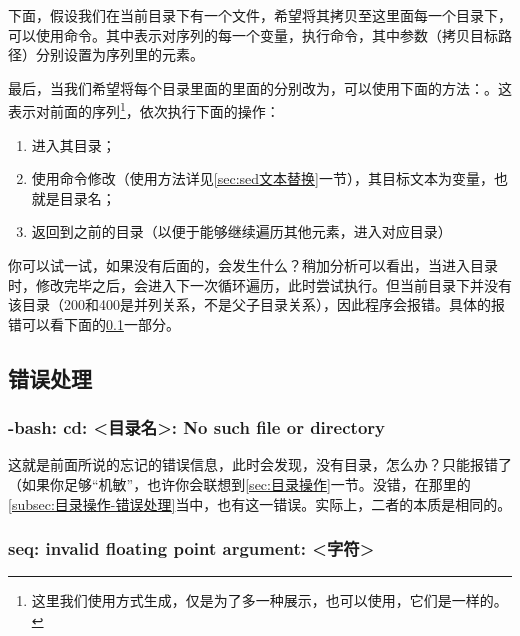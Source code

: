 下面，假设我们在当前目录下有一个文件，希望将其拷贝至这里面每一个目录下，可以使用命令。其中表示对序列的每一个变量，执行命令，其中参数（拷贝目标路径）分别设置为序列里的元素。

最后，当我们希望将每个目录里面的里面的分别改为，可以使用下面的方法：。这表示对前面的序列\footnote{这里我们使用方式生成，仅是为了多一种展示，也可以使用，它们是一样的。}，依次执行下面的操作：

\begin{enumerate}
    \item 进入其目录；
    \item 使用命令修改（使用方法详见\ref{sec:sed文本替换}一节），其目标文本为变量，也就是目录名；
    \item 返回到之前的目录（以便于能够继续遍历其他元素，进入对应目录）
\end{enumerate}

\begin{extend}
    你可以试一试，如果没有后面的，会发生什么？稍加分析可以看出，当进入目录时，修改完毕之后，会进入下一次循环遍历，此时尝试执行。但当前目录下并没有该目录（200和400是并列关系，不是父子目录关系），因此程序会报错。具体的报错可以看下面的\ref{subsec:简单for循环-错误处理}一部分。
\end{extend}


\subsection{错误处理}\label{subsec:简单for循环-错误处理}

\subsubsection{-bash: cd: <目录名>: No such file or directory}

这就是前面所说的忘记的错误信息，此时会发现，没有目录，怎么办？只能报错了（如果你足够“机敏”，也许你会联想到\ref{sec:目录操作}一节。没错，在那里的\ref{subsec:目录操作-错误处理}当中，也有这一错误。实际上，二者的本质是相同的。

\subsubsection{seq: invalid floating point argument: <字符>}

